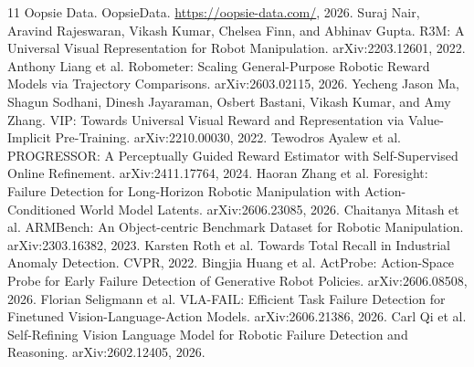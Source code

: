 \documentclass{article}
\begin{document}

\begingroup
\small
\setlength{\bibsep}{0pt}
\begin{thebibliography}{11}
 Oopsie Data. OopsieData. \url{https://oopsie-data.com/}, 2026.
 Suraj Nair, Aravind Rajeswaran, Vikash Kumar, Chelsea Finn, and Abhinav Gupta. R3M: A Universal Visual Representation for Robot Manipulation. arXiv:2203.12601, 2022.
 Anthony Liang et al. Robometer: Scaling General-Purpose Robotic Reward Models via Trajectory Comparisons. arXiv:2603.02115, 2026.
 Yecheng Jason Ma, Shagun Sodhani, Dinesh Jayaraman, Osbert Bastani, Vikash Kumar, and Amy Zhang. VIP: Towards Universal Visual Reward and Representation via Value-Implicit Pre-Training. arXiv:2210.00030, 2022.
 Tewodros Ayalew et al. PROGRESSOR: A Perceptually Guided Reward Estimator with Self-Supervised Online Refinement. arXiv:2411.17764, 2024.
 Haoran Zhang et al. Foresight: Failure Detection for Long-Horizon Robotic Manipulation with Action-Conditioned World Model Latents. arXiv:2606.23085, 2026.
 Chaitanya Mitash et al. ARMBench: An Object-centric Benchmark Dataset for Robotic Manipulation. arXiv:2303.16382, 2023.
 Karsten Roth et al. Towards Total Recall in Industrial Anomaly Detection. CVPR, 2022.
 Bingjia Huang et al. ActProbe: Action-Space Probe for Early Failure Detection of Generative Robot Policies. arXiv:2606.08508, 2026.
 Florian Seligmann et al. VLA-FAIL: Efficient Task Failure Detection for Finetuned Vision-Language-Action Models. arXiv:2606.21386, 2026.
 Carl Qi et al. Self-Refining Vision Language Model for Robotic Failure Detection and Reasoning. arXiv:2602.12405, 2026.
\end{thebibliography}
\endgroup
\end{document}

